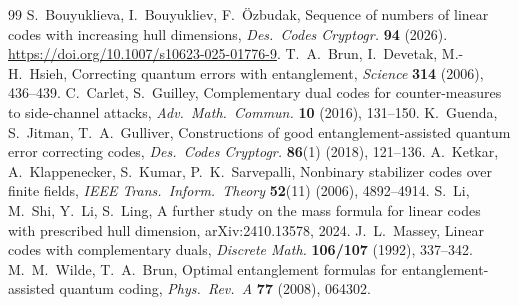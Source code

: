 \documentclass[10pt,a4paper]{amsart}
\begin{document}
\begin{thebibliography}{99}
 S.~Bouyuklieva, I.~Bouyukliev, F.~\"Ozbudak, Sequence of numbers of linear codes with increasing hull dimensions, \textit{Des.\ Codes Cryptogr.} \textbf{94} (2026). \url{https://doi.org/10.1007/s10623-025-01776-9}.
 T.~A.~Brun, I.~Devetak, M.-H.~Hsieh, Correcting quantum errors with entanglement, \textit{Science} \textbf{314} (2006), 436--439.
 C.~Carlet, S.~Guilley, Complementary dual codes for counter-measures to side-channel attacks, \textit{Adv.\ Math.\ Commun.} \textbf{10} (2016), 131--150.
 K.~Guenda, S.~Jitman, T.~A.~Gulliver, Constructions of good entanglement-assisted quantum error correcting codes, \textit{Des.\ Codes Cryptogr.} \textbf{86}(1) (2018), 121--136.
 A.~Ketkar, A.~Klappenecker, S.~Kumar, P.~K.~Sarvepalli, Nonbinary stabilizer codes over finite fields, \textit{IEEE Trans.\ Inform.\ Theory} \textbf{52}(11) (2006), 4892--4914.
 S.~Li, M.~Shi, Y.~Li, S.~Ling, A further study on the mass formula for linear codes with prescribed hull dimension, arXiv:2410.13578, 2024.
 J.~L.~Massey, Linear codes with complementary duals, \textit{Discrete Math.} \textbf{106/107} (1992), 337--342.
 M.~M.~Wilde, T.~A.~Brun, Optimal entanglement formulas for entanglement-assisted quantum coding, \textit{Phys.\ Rev.\ A} \textbf{77} (2008), 064302.
\end{thebibliography}
\end{document}
